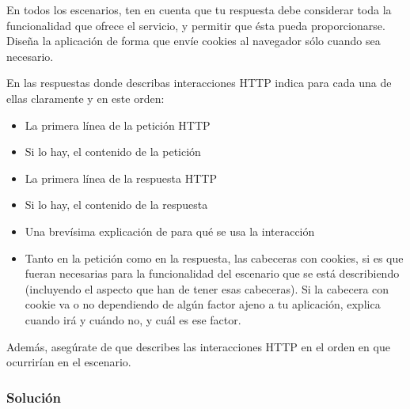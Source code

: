 En todos los escenarios, ten en cuenta que tu respuesta debe considerar toda la funcionalidad que ofrece el servicio, y permitir que ésta pueda proporcionarse. Diseña la aplicación de forma que envíe cookies al navegador sólo cuando sea necesario.

En las respuestas donde describas interacciones HTTP indica para cada una de ellas claramente y en este orden:
  \begin{itemize}
  \item La primera línea de la petición HTTP
  \item Si lo hay, el contenido de la petición
  \item La primera línea de la respuesta HTTP
  \item Si lo hay, el contenido de la respuesta
  \item Una brevísima explicación de para qué se usa la interacción
  \item Tanto en la petición como en la respuesta, las cabeceras con cookies, si es que fueran necesarias para la funcionalidad del escenario que se está describiendo (incluyendo el aspecto que han de tener esas cabeceras). Si la cabecera con cookie va o no dependiendo de algún factor ajeno a tu aplicación, explica cuando irá y cuándo no, y cuál es ese factor.
  \end{itemize}

Además, asegúrate de que describes las interacciones HTTP en el orden en que ocurrirían en el escenario.

\subsubsection{Solución}

